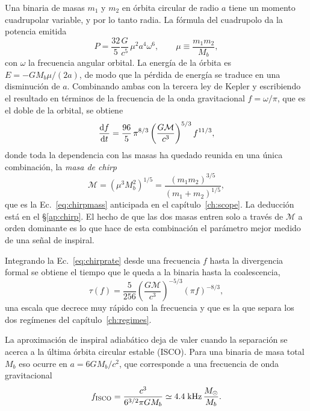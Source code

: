 \documentclass[11pt,a4paper,openany]{book}
\newcommand{\Msun}{M_{\odot}}
\begin{document}
Una binaria de masas $m_1$ y $m_2$ en \'orbita circular de radio $a$ tiene un
momento cuadrupolar variable, y por lo tanto radia. La f\'ormula del
cuadrupolo da la potencia emitida \citep{PetersMathews1963}
\begin{equation}
  P=\frac{32}{5}\frac{G}{c^{5}}\,\mu^{2}a^{4}\omega^{6},
  \qquad \mu\equiv\frac{m_1m_2}{M_b} ,
  \label{eq:quadpower}
\end{equation}
con $\omega$ la frecuencia angular orbital. La energ\'ia de la \'orbita es
$E=-GM_b\mu/(2a)$, de modo que la p\'erdida de energ\'ia se traduce en una
disminuci\'on de $a$. Combinando ambas con la tercera ley de Kepler y
escribiendo el resultado en t\'erminos de la frecuencia de la onda
gravitacional $f=\omega/\pi$, que es el doble de la orbital, se obtiene
\begin{equation}
  \dv{f}{t}=\frac{96}{5}\,\pi^{8/3}
  \left(\frac{G\mathcal{M}}{c^{3}}\right)^{5/3} f^{11/3} ,
  \label{eq:chirprate}
\end{equation}
donde toda la dependencia con las masas ha quedado reunida en una \'unica
combinaci\'on, la \emph{masa de chirp}
\begin{equation}
  \mathcal{M}=\left(\mu^{3}M_b^{2}\right)^{1/5}
  =\frac{(m_1m_2)^{3/5}}{(m_1+m_2)^{1/5}} ,
  \label{eq:chirpmass_def}
\end{equation}
que es la Ec.~\eqref{eq:chirpmass} anticipada en el
cap\'itulo~\ref{ch:scope}. La deducci\'on est\'a en el \S\ref{ap:chirp}. El
hecho de que las dos masas entren solo a trav\'es de $\mathcal{M}$ a orden
dominante es lo que hace de esta combinaci\'on el par\'ametro mejor medido de
una se\~nal de inspiral.

Integrando la Ec.~\eqref{eq:chirprate} desde una frecuencia $f$ hasta la
divergencia formal se obtiene el tiempo que le queda a la binaria hasta la
coalescencia,
\begin{equation}
  \tau(f)=\frac{5}{256}
  \left(\frac{G\mathcal{M}}{c^{3}}\right)^{-5/3}
  \left(\pi f\right)^{-8/3} ,
  \label{eq:time_to_merger}
\end{equation}
una escala que decrece muy r\'apido con la frecuencia y que es la que separa
los dos reg\'imenes del cap\'itulo~\ref{ch:regimes}.

La aproximaci\'on de inspiral adiab\'atico deja de valer cuando la separaci\'on
se acerca a la \'ultima \'orbita circular estable (ISCO). Para una binaria de masa
total $M_b$ eso ocurre en $a=6GM_b/c^{2}$, que corresponde a una frecuencia de
onda gravitacional
\begin{equation}
  f_{\rm ISCO}=\frac{c^{3}}{6^{3/2}\pi G M_b}
  \simeq 4.4\;\mathrm{kHz}\,\frac{\Msun}{M_b} .
  \label{eq:fisco}
\end{equation}
\end{document}

